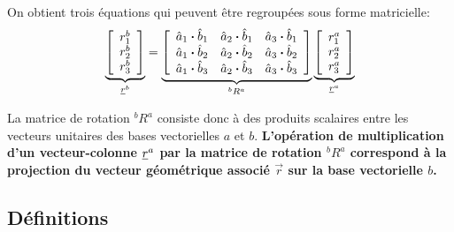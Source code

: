 On obtient trois équations qui peuvent être regroupées sous forme matricielle:
\begin{align}
\underbrace{ \left[ \begin{array}{c} r_1^b \\ r_2^b \\ r_3^b  \end{array} \right] }_{\underline{r}^b}
=
\underbrace{ \left[ \begin{array}{c c c} 
\hat{a}_1 \boldsymbol{\cdot} \hat{b}_1 & \hat{a}_2 \boldsymbol{\cdot} \hat{b}_1 & \hat{a}_3 \boldsymbol{\cdot} \hat{b}_1 \\
\hat{a}_1 \boldsymbol{\cdot} \hat{b}_2 & \hat{a}_2 \boldsymbol{\cdot} \hat{b}_2 & \hat{a}_3 \boldsymbol{\cdot} \hat{b}_2 \\
\hat{a}_1 \boldsymbol{\cdot} \hat{b}_3 & \hat{a}_2 \boldsymbol{\cdot} \hat{b}_3 & \hat{a}_3 \boldsymbol{\cdot} \hat{b}_3 
\end{array} \right] }_{^bR^a}
\underbrace{ \left[ \begin{array}{c} r_1^a \\ r_2^a \\ r_3^a  \end{array} \right] }_{\underline{r}^a}
\label{eq:Rdot}
\end{align} 

La matrice de rotation $^bR^a$ consiste donc à des produits scalaires entre les vecteurs unitaires des bases vectorielles $a$ et $b$. \textbf{L'opération de multiplication d'un vecteur-colonne $\underline{r}^a$ par la matrice de rotation $^bR^a$ correspond à la projection du vecteur géométrique associé $\vec{r}$ sur la base vectorielle $b$.}



\subsection{Définitions}

